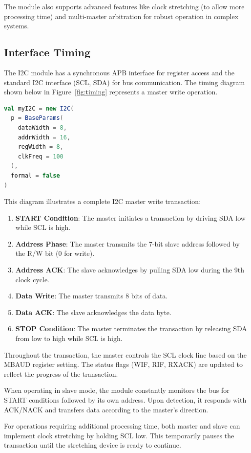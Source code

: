 The module also supports advanced features like clock stretching (to allow more processing time) and multi-master arbitration for robust operation in complex systems.

\newpage
\subsection{Interface Timing}

The I2C module has a synchronous APB interface for register access and the standard I2C interface (SCL, SDA) for bus communication. The timing diagram shown below in Figure~\ref{fig:timing} represents a master write operation.

\begin{lstlisting}[language=Scala]
val myI2C = new I2C(
  p = BaseParams(
    dataWidth = 8,
    addrWidth = 16,
    regWidth = 8,
    clkFreq = 100
  ),
  formal = false
)
\end{lstlisting}


This diagram illustrates a complete I2C master write transaction:

\begin{enumerate}
    \item \textbf{START Condition}: The master initiates a transaction by driving SDA low while SCL is high.
    \item \textbf{Address Phase}: The master transmits the 7-bit slave address followed by the R/W bit (0 for write).
    \item \textbf{Address ACK}: The slave acknowledges by pulling SDA low during the 9th clock cycle.
    \item \textbf{Data Write}: The master transmits 8 bits of data.
    \item \textbf{Data ACK}: The slave acknowledges the data byte.
    \item \textbf{STOP Condition}: The master terminates the transaction by releasing SDA from low to high while SCL is high.
\end{enumerate}

Throughout the transaction, the master controls the SCL clock line based on the MBAUD register setting. The status flags (WIF, RIF, RXACK) are updated to reflect the progress of the transaction.

When operating in slave mode, the module constantly monitors the bus for START conditions followed by its own address. Upon detection, it responds with ACK/NACK and transfers data according to the master's direction.

For operations requiring additional processing time, both master and slave can implement clock stretching by holding SCL low. This temporarily pauses the transaction until the stretching device is ready to continue.